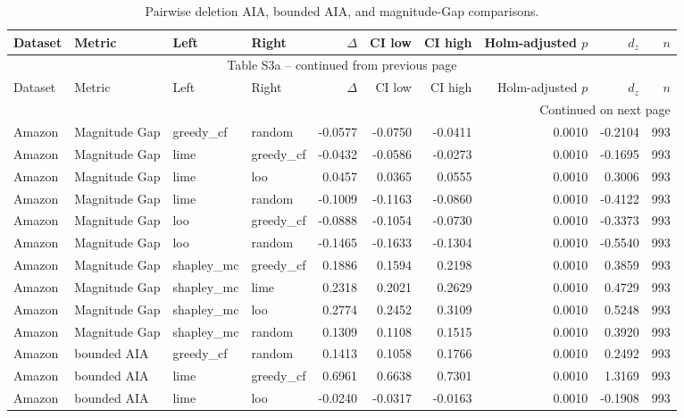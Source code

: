 \begin{longtable}{@{}p{.12\linewidth}p{.18\linewidth}p{.13\linewidth}p{.13\linewidth}rrrrrr@{}}
\caption{Pairwise deletion AIA, bounded AIA, and magnitude-Gap comparisons.}\label{tab:S3a}\\
\toprule
Dataset & Metric & Left & Right & $\Delta$ & CI low & CI high & Holm-adjusted $p$ & $d_z$ & $n$ \\
\midrule
\endfirsthead
\multicolumn{10}{c}{Table S3a -- continued from previous page}\\
\toprule
Dataset & Metric & Left & Right & $\Delta$ & CI low & CI high & Holm-adjusted $p$ & $d_z$ & $n$ \\
\midrule
\endhead
\midrule
\multicolumn{10}{r}{Continued on next page}\\
\endfoot
\bottomrule
\endlastfoot
Amazon & Magnitude Gap & greedy\_cf & random & -0.0577 & -0.0750 & -0.0411 & 0.0010 & -0.2104 & 993 \\
Amazon & Magnitude Gap & lime & greedy\_cf & -0.0432 & -0.0586 & -0.0273 & 0.0010 & -0.1695 & 993 \\
Amazon & Magnitude Gap & lime & loo & 0.0457 & 0.0365 & 0.0555 & 0.0010 & 0.3006 & 993 \\
Amazon & Magnitude Gap & lime & random & -0.1009 & -0.1163 & -0.0860 & 0.0010 & -0.4122 & 993 \\
Amazon & Magnitude Gap & loo & greedy\_cf & -0.0888 & -0.1054 & -0.0730 & 0.0010 & -0.3373 & 993 \\
Amazon & Magnitude Gap & loo & random & -0.1465 & -0.1633 & -0.1304 & 0.0010 & -0.5540 & 993 \\
Amazon & Magnitude Gap & shapley\_mc & greedy\_cf & 0.1886 & 0.1594 & 0.2198 & 0.0010 & 0.3859 & 993 \\
Amazon & Magnitude Gap & shapley\_mc & lime & 0.2318 & 0.2021 & 0.2629 & 0.0010 & 0.4729 & 993 \\
Amazon & Magnitude Gap & shapley\_mc & loo & 0.2774 & 0.2452 & 0.3109 & 0.0010 & 0.5248 & 993 \\
Amazon & Magnitude Gap & shapley\_mc & random & 0.1309 & 0.1108 & 0.1515 & 0.0010 & 0.3920 & 993 \\
Amazon & bounded AIA & greedy\_cf & random & 0.1413 & 0.1058 & 0.1766 & 0.0010 & 0.2492 & 993 \\
Amazon & bounded AIA & lime & greedy\_cf & 0.6961 & 0.6638 & 0.7301 & 0.0010 & 1.3169 & 993 \\
Amazon & bounded AIA & lime & loo & -0.0240 & -0.0317 & -0.0163 & 0.0010 & -0.1908 & 993 \\

\end{longtable}
